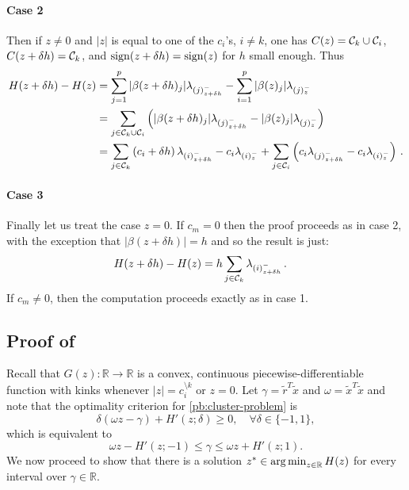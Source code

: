 \paragraph{Case 2}
Then if  $z \neq 0$ and $|z|$ is equal to one of the $c_i$'s, $i \neq k$,  one has $C(z) = \mathcal{C}_k \cup \mathcal{C}_i$, $C(z + \delta h) = \mathcal{C}_k$, and $\operatorname{sign}(z + \delta h) = \operatorname{sign}(z)$ for $h$ small enough.
Thus
\begin{align}
  H(z + \delta h) - H(z)
   & = \sum_{j =1}^p |\beta(z + \delta h)_j| \lambda_{(j)^-_{z + \delta h}}
  - \sum_{i=1}^p |\beta(z)_j| \lambda_{(j)^-_z}  \nonumber                                         \\
   & = \sum_{j \in \mathcal{C}_k \cup \mathcal{C}_i} \left( |\beta(z + \delta h)_j| \lambda_{(j)^-_{z + \delta h}}
  - |\beta(z)_j| \lambda_{(j)^-_z} \right)  \nonumber                                              \\
   & = \sum_{j \in \mathcal{C}_k} \left( c_i + \delta h \right) \lambda_{(i)^-_{z + \delta h}}
  - c_i \lambda_{(i)^-_z}
  + \sum_{j \in \mathcal{C}_i} \left( c_i \lambda_{(j)^-_{z + \delta h}}
    - c_i \lambda_{(i)^-_z} \right) \, .
\end{align}

\paragraph{Case 3} Finally let us treat the case $z = 0$.
If $c_m = 0$ then the proof proceeds as in case 2, with the exception that $|\beta(z + \delta h)| = h$ and so the result is just:
\begin{align}
  H(z + \delta h) - H(z)
   & = h \sum_{j \in \mathcal{C}_k} \lambda_{(i)^-_{z + \delta h}} \, .
\end{align}
If $c_m \neq 0$, then the computation proceeds exactly as in case 1.

\subsection{Proof of }

Recall that \(G(z) : \mathbb{R} \to \mathbb{R}\) is a convex,
continuous piecewise-differentiable function with kinks whenever \(|z| =
c_i^{\setminus k}\) or \(z = 0\). Let \(\gamma = \tilde{r}^T\tilde{x}\)
and \(\omega = \tilde{x}^T\tilde{x}\) and note that the optimality criterion for
\eqref{pb:cluster-problem} is
\[
  \delta(\omega z - \gamma) + H'(z; \delta) \geq 0, \quad
  \forall \delta \in \{-1, 1\},
\]
which is equivalent to
\begin{equation}
  \label{eq:optimality-inequality}
  \omega z - H'(z; -1) \leq \gamma \leq \omega z + H'(z; 1).
\end{equation}
We now proceed to show that there is a solution \(z^* \in \operatorname*{arg\,min}_{z \in
  \mathbb{R}} H(z)\) for every interval over \(\gamma \in \mathbb{R}\).

